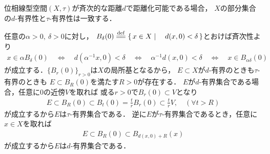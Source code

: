 	\begin{screen}
		\begin{thm}[斉次距離で距離化可能なら距離と位相の有界性は一致する]
			位相線型空間$(X,\tau)$が斉次的な距離$d$で距離化可能である場合，
			$X$の部分集合の$d$-有界性と$\tau$-有界性は一致する．
		\end{thm}
	\end{screen}
	
	\begin{prf}
		任意の$\alpha>0,\ \delta>0$に対し，
		$B_{\delta}(0) \defeq \Set{x \in X}{d(x,0) < \delta}$とおけば斉次性より
		\begin{align}
			x \in \alpha B_{\delta}(0) 
			\quad \Longleftrightarrow \quad d\left( \alpha^{-1}x,0 \right) < \delta
			\quad \Longleftrightarrow \quad \alpha^{-1}d(x,0) < \delta
			\quad \Longleftrightarrow \quad x \in B_{\alpha\delta}(0)
		\end{align}
		が成立する．$\{B_r(0)\}_{r > 0}$は$X$の局所基となるから，
		$E \subset X$が$d$-有界のときも$\tau$-有界のときも
		$E \subset B_R(0)$を満たす$R > 0$が存在する．
		$E$が$d$-有界集合である場合，任意に0の近傍$V$を取れば
		或る$r > 0$で$B_r(0) \subset V$となり
		\begin{align}
			E \subset B_R(0) \subset B_t(0) = \frac{t}{r} B_r(0) \subset \frac{t}{r}V,
			\quad (\forall t > R)
		\end{align}
		が成立するから$E$は$\tau$-有界集合である．
		逆に$E$が$\tau$-有界集合であるとき，任意に$x \in X$を取れば
		\begin{align}
			E \subset B_R(0) \subset B_{d(x,0) + R}(x)
		\end{align}
		が成立するから$E$は$d$-有界集合である．
		\QED
	\end{prf}
	
